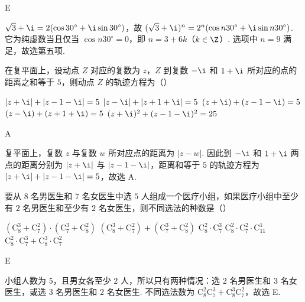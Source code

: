 \begin{answer}
E
\end{answer}

\begin{solution}
\(\sqrt{3}+\i=2(\cos30^{\circ}+\i\sin30^{\circ})\)，故 \((\sqrt{3}+\i)^n=2^n(\cos n30^{\circ}+\i\sin n30^{\circ})\). 它为纯虚数当且仅当 \(\cos n30^{\circ}=0\)，即 \(n=3+6k\)（\(k\in\Z\)）. 选项中 \(n=9\) 满足，故选第五项.
\end{solution}

\begin{problem}

在复平面上，设动点 \(Z\) 对应的复数为 \(z\)，\(Z\) 到复数 \(-\i\) 和 \(1+\i \) 所对应的点的距离之和等于 \(5\)，则动点 \(Z\) 的轨迹方程为（\quad）

\choicesfive
    {\(\left|z+\i\right|+\left|z-1-\i\right|=5 \)}
    {\(\left|z-\i\right|+\left|z+1+\i\right|=5 \)}
    {\((z+\i)+(z-1-\i)=5 \)}
    {\((z-\i)+(z+1+\i)=5 \)}
    {\((z + \i)^{2} + (z - 1 - \i)^{2} = 25 \)}
\end{problem}

\begin{answer}
A
\end{answer}

\begin{solution}
复平面上，复数 \(z\) 与复数 \(w\) 所对应点的距离为 \(|z-w|\). 因此到 \(-\i\) 和 \(1+\i\) 两点的距离分别为 \(|z+\i|\) 与 \(|z-1-\i|\)，距离和等于 \(5\) 的轨迹方程为 \(|z+\i|+|z-1-\i|=5\)，故选 A.
\end{solution}

\begin{problem}

要从 \(8\) 名男医生和 \(7\) 名女医生中选 \(5\) 人组成一个医疗小组，如果医疗小组中至少有 \(2\) 名男医生和至少有 \(2\) 名女医生，则不同选法的种数是（\quad）

\choicesfive
    {\((\mathrm C_8^3 + \mathrm C_7^2)\cdot (\mathrm C_7^3 + \mathrm C_8^2) \)}
    {\((\mathrm C_8^3 + \mathrm C_7^2) + (\mathrm C_7^3 + \mathrm C_8^2) \)}
    {\(\mathrm C_8^2\cdot \mathrm C_7^3 \)}
    {\(\mathrm C_8^2\cdot \mathrm C_7^2\cdot \mathrm C_11^1 \)}
    {\(\mathrm C_8^2\cdot \mathrm C_7^3 + \mathrm C_8^3\cdot \mathrm C_7^2\)}
\end{problem}

\begin{answer}
E
\end{answer}

\begin{solution}
小组人数为 \(5\)，且男女各至少 \(2\) 人，所以只有两种情况：选 \(2\) 名男医生和 \(3\) 名女医生，或选 \(3\) 名男医生和 \(2\) 名女医生. 不同选法数为 \(\mathrm C_8^2\mathrm C_7^3+\mathrm C_8^3\mathrm C_7^2\)，故选 E.
\end{solution}

